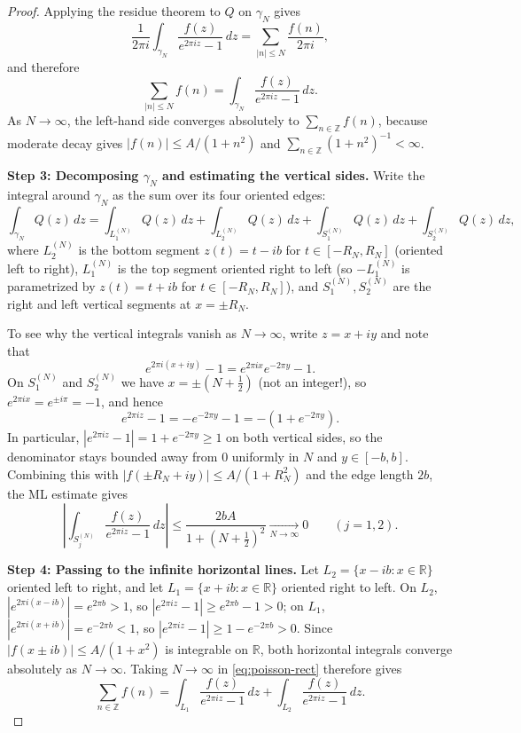 \documentclass[11pt]{article}
\theoremstyle{plain}
\theoremstyle{definition}
\theoremstyle{boldremark}
\theoremstyle{remark}
\numberwithin{equation}{section}
\newcommand{\R}{\mathbb{R}}
\newcommand{\Z}{\mathbb{Z}}
\begin{document}
\begin{proof}
Applying the residue theorem to $Q$ on $\gamma_N$ gives
\[
 \frac{1}{2\pi i}\int_{\gamma_N}\frac{f(z)}{e^{2\pi i z}-1}\,dz
 = \sum_{|n|\leq N}\frac{f(n)}{2\pi i},
\]
and therefore
\begin{equation}\label{eq:poisson-rect}
 \sum_{|n|\leq N} f(n) = \int_{\gamma_N}\frac{f(z)}{e^{2\pi i z}-1}\,dz.
\end{equation}
As $N\to\infty$, the left-hand side converges absolutely to
$\sum_{n\in\Z} f(n)$, because moderate decay gives
$|f(n)|\leq A/(1+n^2)$ and $\sum_{n\in\Z}(1+n^2)^{-1}<\infty$.

\textbf{Step 3: Decomposing $\gamma_N$ and estimating the vertical sides.}
Write the integral around $\gamma_N$ as the sum over its four oriented edges:
\[
 \int_{\gamma_N} Q(z)\,dz
 = \int_{L_1^{(N)}} Q(z)\,dz
 + \int_{L_2^{(N)}} Q(z)\,dz
 + \int_{S_1^{(N)}} Q(z)\,dz
 + \int_{S_2^{(N)}} Q(z)\,dz,
\]
where $L_2^{(N)}$ is the bottom segment $z(t)=t-ib$ for $t\in[-R_N,R_N]$
(oriented left to right), $L_1^{(N)}$ is the top segment oriented right to
left (so $-L_1^{(N)}$ is parametrized by $z(t)=t+ib$ for $t\in[-R_N,R_N]$),
and $S_1^{(N)},S_2^{(N)}$ are the right and left vertical segments at
$x=\pm R_N$.

To see why the vertical integrals vanish as $N\to\infty$, write $z=x+iy$
and note that
\[
 e^{2\pi i(x+iy)}-1 = e^{2\pi i x}e^{-2\pi y}-1.
\]
On $S_1^{(N)}$ and $S_2^{(N)}$ we have $x=\pm(N+\tfrac12)$ (not an integer!),
so $e^{2\pi i x}=e^{\pm i\pi}=-1$, and hence
\[
 e^{2\pi i z}-1 = -e^{-2\pi y}-1 = -(1+e^{-2\pi y}).
\]
In particular, $|e^{2\pi i z}-1|=1+e^{-2\pi y}\geq 1$ on both vertical
sides, so the denominator stays bounded away from $0$ uniformly in $N$ and
$y\in[-b,b]$. Combining this with $|f(\pm R_N+iy)|\leq A/(1+R_N^2)$ and the
edge length $2b$, the ML estimate gives
\[
 \left|\int_{S_j^{(N)}}\frac{f(z)}{e^{2\pi i z}-1}\,dz\right|
 \leq \frac{2bA}{1+(N+\tfrac12)^2} \xrightarrow[N\to\infty]{} 0
 \qquad (j=1,2).
\]

\textbf{Step 4: Passing to the infinite horizontal lines.}
Let $L_2=\{x-ib:x\in\R\}$ oriented left to right, and let
$L_1=\{x+ib:x\in\R\}$ oriented right to left. On $L_2$,
$|e^{2\pi i(x-ib)}|=e^{2\pi b}>1$, so $|e^{2\pi i z}-1|\geq e^{2\pi b}-1>0$;
on $L_1$, $|e^{2\pi i(x+ib)}|=e^{-2\pi b}<1$, so
$|e^{2\pi i z}-1|\geq 1-e^{-2\pi b}>0$. Since $|f(x\pm ib)|\leq A/(1+x^2)$
is integrable on $\R$, both horizontal integrals converge absolutely as
$N\to\infty$. Taking $N\to\infty$ in \eqref{eq:poisson-rect} therefore gives
\begin{equation}\label{eq:poisson-lines}
 \sum_{n\in\Z} f(n)
 = \int_{L_1}\frac{f(z)}{e^{2\pi i z}-1}\,dz
 + \int_{L_2}\frac{f(z)}{e^{2\pi i z}-1}\,dz.
\end{equation}


\end{proof}
\end{document}

